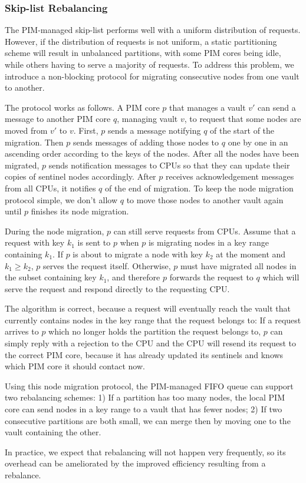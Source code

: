 \subsubsection{Skip-list Rebalancing}
The PIM-managed skip-list performs well with a uniform distribution of requests.
However, if the distribution of requests is not uniform, a static partitioning scheme 
will result in unbalanced partitions, with some PIM cores being idle, while others having to 
serve a majority of requests. To address this problem, we introduce a non-blocking protocol for 
migrating consecutive nodes from one vault to another. 

The protocol works as follows. 
A PIM core $p$ that manages a vault $v'$ can send a message to another PIM core $q$, managing vault 
$v$, to request that some nodes are moved from $v'$ to $v$. 
First, $p$ sends a message notifying $q$ of the start of the migration. 
Then $p$ sends messages of adding those nodes to $q$ one by one in an ascending order 
according to the keys of the nodes. 
After all the nodes have been migrated, $p$ sends notification messages to CPUs so that 
they can update their copies of sentinel nodes accordingly.
After $p$ receives acknowledgement messages from all CPUs, it notifies $q$ of the end of migration.
To keep the node migration protocol simple, we don't allow $q$ to move those nodes 
to another vault again until $p$ finishes its node migration. 

During the node migration, $p$ can still serve requests from CPUs.
Assume that a request with key $k_1$ is sent to $p$ when $p$ is migrating nodes 
in a key range containing $k_1$.  
If $p$ is about to migrate a node with key $k_2$ at the moment and $k_1 \ge k_2$, 
$p$ serves the request itself. 
Otherwise, $p$ must have migrated all nodes in the subset containing key $k_1$, and therefore $p$ 
forwards the request to $q$ which will serve the request and respond directly to the requesting CPU. 

The algorithm is correct, because a request will eventually reach the vault that 
currently contains nodes in the key range that the request belongs to: 
If a request arrives to $p$ which no longer holds the partition the request belongs to, 
$p$ can simply reply with a rejection to the CPU and the CPU will resend its request to 
the correct PIM core, 
because it has already updated its sentinels and knows which PIM core it should contact now. 

Using this node migration protocol, the PIM-managed FIFO queue can support two rebalancing schemes:
1) If a partition has too many nodes, the local PIM core can send nodes in a key range to a vault 
that has fewer nodes;
2) If two consecutive partitions are both small, 
we can merge then by moving one to the vault containing the other. 

In practice, we expect that rebalancing will not happen very frequently, so its overhead can be 
ameliorated by the improved efficiency resulting from a rebalance. 

